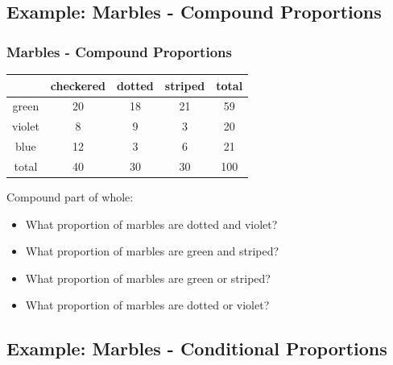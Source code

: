
\subsection{Example: Marbles - Compound Proportions}



\begin{frame}
\frametitle{Marbles - Compound Proportions}

\begin{center}
\begin{tabular}{c|c c c | c}
       & checkered & dotted & striped & total \\ \hline
green  &  20       &  18    & 21 & 59 \\
violet & 8         &  9     & 3  & 20 \\
blue   & 12        & 3      & 6  & 21 \\ \hline
total  & 40        & 30     & 30 & 100 
\end{tabular}
\end{center}

Compound part of whole:
\begin{itemize}
\item What proportion of marbles are dotted and violet? 
\item What proportion of marbles are green and striped? 
\item What proportion of marbles are green or striped? 
\item What proportion of marbles are dotted or violet? 
\end{itemize}

\end{frame}



\subsection{Example: Marbles - Conditional Proportions}



